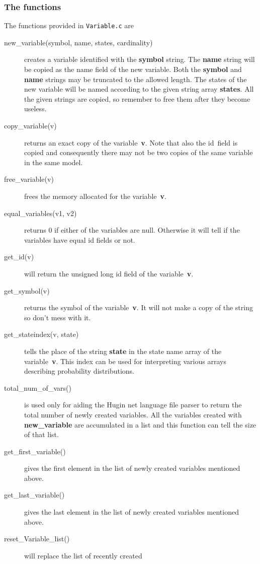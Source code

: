 \documentclass[12pt,a4paper]{report}
\begin{document}
\subsubsection{The functions}
The functions provided in \verb+Variable.c+ are
\begin{description}
\item[new\_variable(symbol, name, states, cardinality)] creates a
variable identified with the \textbf{symbol} string. The \textbf{name} 
string will be copied as the name field of the new variable. Both the 
\textbf{symbol} and \textbf{name} strings may be truncated to the 
allowed length. The states of the new variable will be named according 
to the given string array \textbf{states}. All the given strings are 
copied, so remember to free them after they become useless.
\item[copy\_variable(v)] returns an exact copy of the
variable~\textbf{v}. Note that also the id~field is copied and 
consequently there may not be two copies of the same variable in the 
same model.
\item[free\_variable(v)] frees the memory allocated for the
variable~\textbf{v}. 
\item[equal\_variables(v1, v2)] returns 0 if either of the variables
are null. Otherwise it will tell if the variables have equal id fields
or not.
\item[get\_id(v)] will return the unsigned long id field of the 
variable~\textbf{v}.
\item[get\_symbol(v)] returns the symbol of the variable~\textbf{v}. It
will not make a copy of the string so don't mess with it.
\item[get\_stateindex(v, state)] tells the place of the string
\textbf{state} in the state name array of the
variable~\textbf{v}. This index can be used for interpreting various
arrays describing probability distributions. 
\item[total\_num\_of\_vars()] is used only for aiding the Hugin net 
language file parser to return the total number of newly created 
variables. All the variables created with \textbf{new\_variable} are 
accumulated in a list and this function can tell the size of that list.
\item[get\_first\_variable()] gives the first element in the list
of newly created variables mentioned above.
\item[get\_last\_variable()] gives the last element in the list
of newly created variables mentioned above.
\item[reset\_Variable\_list()] will replace the list of recently created

\end{description}
\end{document}
